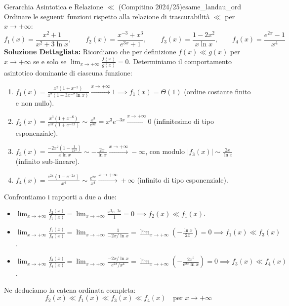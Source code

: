 \begin{esempio}{Gerarchia Asintotica e Relazione $\ll$ (Compitino 2024/25)}{esame_landau_ord}
Ordinare le seguenti funzioni rispetto alla relazione di trascurabilità $\ll$ per $x \to +\infty$:
\[
    f_1(x) = \frac{x^2 + 1}{x^2 + 3\ln x}, \qquad f_2(x) = \frac{x^{-3} + x^3}{e^{3x} + 1}, \qquad f_3(x) = \frac{1 - 2x^2}{x\ln x}, \qquad f_4(x) = \frac{e^{2x} - 1}{x^4}
\]
\tcblower
\textbf{Soluzione Dettagliata:}
Ricordiamo che per definizione $f(x) \ll g(x)$ per $x \to +\infty$ se e solo se $\lim_{x \to +\infty} \frac{f(x)}{g(x)} = 0$.
Determiniamo il comportamento asintotico dominante di ciascuna funzione:
\begin{enumerate}
    \item $f_1(x) = \frac{x^2(1 + x^{-2})}{x^2(1 + 3x^{-2}\ln x)} \xrightarrow{x \to +\infty} 1 \implies f_1(x) = \Theta(1)$ (ordine costante finito e non nullo).
    \item $f_2(x) = \frac{x^3(1 + x^{-6})}{e^{3x}(1 + e^{-3x})} \sim \frac{x^3}{e^{3x}} = x^3 e^{-3x} \xrightarrow{x \to +\infty} 0$ (infinitesimo di tipo esponenziale).
    \item $f_3(x) = \frac{-2x^2(1 - \frac{1}{2x^2})}{x\ln x} \sim -\frac{2x}{\ln x} \xrightarrow{x \to +\infty} -\infty$, con modulo $|f_3(x)| \sim \frac{2x}{\ln x}$ (infinito sub-lineare).
    \item $f_4(x) = \frac{e^{2x}(1 - e^{-2x})}{x^4} \sim \frac{e^{2x}}{x^4} \xrightarrow{x \to +\infty} +\infty$ (infinito di tipo esponenziale).
\end{enumerate}
Confrontiamo i rapporti a due a due:
\begin{itemize}
    \item $\lim_{x \to +\infty} \frac{f_2(x)}{f_1(x)} = \lim_{x \to +\infty} \frac{x^3 e^{-3x}}{1} = 0 \implies f_2(x) \ll f_1(x)$.
    \item $\lim_{x \to +\infty} \frac{f_1(x)}{f_3(x)} = \lim_{x \to +\infty} \frac{1}{-2x/\ln x} = \lim_{x \to +\infty} \left(-\frac{\ln x}{2x}\right) = 0 \implies f_1(x) \ll f_3(x)$.
    \item $\lim_{x \to +\infty} \frac{f_3(x)}{f_4(x)} = \lim_{x \to +\infty} \frac{-2x/\ln x}{e^{2x}/x^4} = \lim_{x \to +\infty} \left(-\frac{2x^5}{e^{2x}\ln x}\right) = 0 \implies f_3(x) \ll f_4(x)$.
\end{itemize}
Ne deduciamo la catena ordinata completa:
\[
    f_2(x) \ll f_1(x) \ll f_3(x) \ll f_4(x) \quad \text{per } x \to +\infty
\]
\end{esempio}

